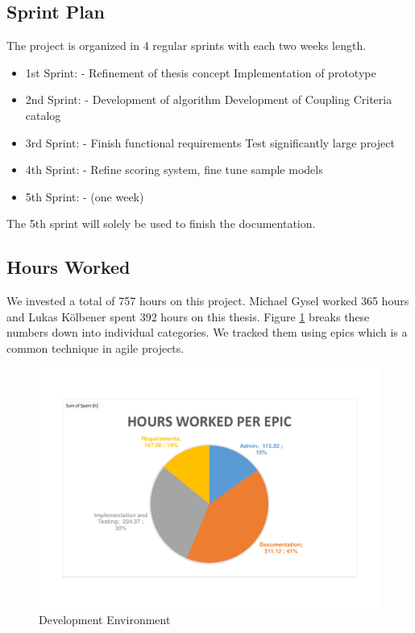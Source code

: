 \subsection{Sprint Plan}
\label{sec:projplan}

The project is organized in 4 regular sprints with each two weeks length. 

\begin{itemize}
\item 1st Sprint:  - 
\subitem Refinement of thesis concept
\subitem Implementation of prototype
\item 2nd Sprint:  - 
\subitem Development of algorithm
\subitem Development of Coupling Criteria catalog
\item 3rd Sprint:  - 
\subitem Finish functional requirements
\subitem Test significantly large project
\item 4th Sprint:  - 
\subitem Refine scoring system, fine tune sample models
\item 5th Sprint:  -  (one week)
\end{itemize}

The 5th sprint will solely be used to finish the documentation.

\subsection{Hours Worked}

We invested a total of 757 hours on this project. Michael Gysel worked 365 hours and Lukas Kölbener spent 392 hours on this thesis. Figure \ref{fig:hoursworked} breaks these numbers down into individual categories. We tracked them using epics which is a common technique in agile projects.

\begin{figure}[H]
	\includegraphics[scale=0.7]{diagrams/hoursperepic.pdf}
	\caption{Development Environment}
	\label{fig:hoursworked}
\end{figure}